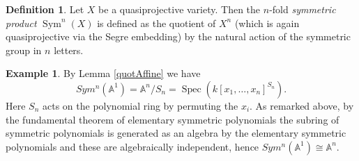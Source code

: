 \documentclass[11pt, a4paper, german, twoside]{article}
\theoremstyle{plain}
\theoremstyle{definition}
\newtheorem{definition}[theorem]{Definition}
\newtheorem{example}[theorem]{Example}
\DeclareMathOperator{\Spec}{Spec}
\DeclareMathOperator{\Sym}{Sym}
\begin{document}
\begin{definition}
    \label{symdef}
    Let $X$ be a quasiprojective variety. Then the $n$-fold \emph{symmetric product} $\Sym^n(X)$ is defined as the quotient of $X^n$
    (which is again quasiprojective via the Segre embedding) by the natural action of the symmetric group in $n$ letters.
\end{definition}

\begin{example}
    By Lemma \ref{quotAffine} we have 
    \[
        Sym^n(\mathbb{A}^1) = \mathbb{A}^n/S_n = \Spec(k[x_1,\dots,x_n]^{S_n}).
    \]
    Here $S_n$ acts on the
    polynomial ring by permuting the $x_i$. As remarked above, by the fundamental theorem of elementary symmetric polynomials the subring
    of symmetric polynomials is generated as an algebra by the elementary symmetric polynomials and these are algebraically independent, hence
    $Sym^n(\mathbb{A}^1) \cong \mathbb{A}^n$.
\end{example}
\end{document}
